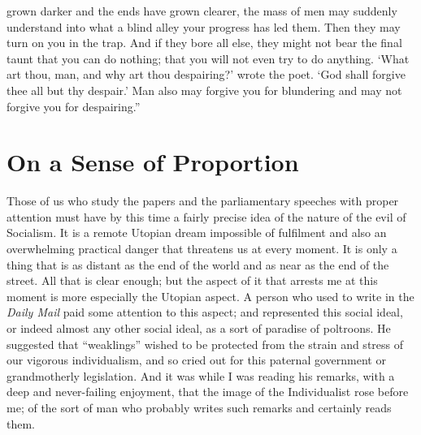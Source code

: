 \documentclass{book}
\begin{document}
grown darker and the ends have grown clearer, the mass of men may suddenly understand into what a blind alley your progress has led them. Then they may turn on you in the trap. And if they bore all else, they might not bear the final taunt that you can do nothing; that you will not even try to do anything. ‘What art thou, man, and why art thou despairing?’ wrote the poet. ‘God shall forgive thee all but thy despair.’ Man also may forgive you for blundering and may not forgive you for despairing.”

\chapter{On a Sense of Proportion}
\label{chapter-4}
Those of us who study the papers and the parliamentary speeches with proper attention must have by this time a fairly precise idea of the nature of the evil of Socialism. It is a remote Utopian dream impossible of fulfilment and also an overwhelming practical danger that threatens us at every moment. It is only a thing that is as distant as the end of the world and as near as the end of the street. All that is clear enough; but the aspect of it that arrests me at this moment is more especially the Utopian aspect. A person who used to write in the \emph{Daily Mail} paid some attention to this aspect; and represented this social ideal, or indeed almost any other social ideal, as a sort of paradise of poltroons. He suggested that “weaklings” wished to be protected from the strain and stress of our vigorous individualism, and so cried out for this paternal government or grandmotherly legislation. And it was while I was reading his remarks, with a deep and never-failing enjoyment, that the image of the Individualist rose before me; of the sort of man who probably writes such remarks and certainly reads them.
\end{document}
